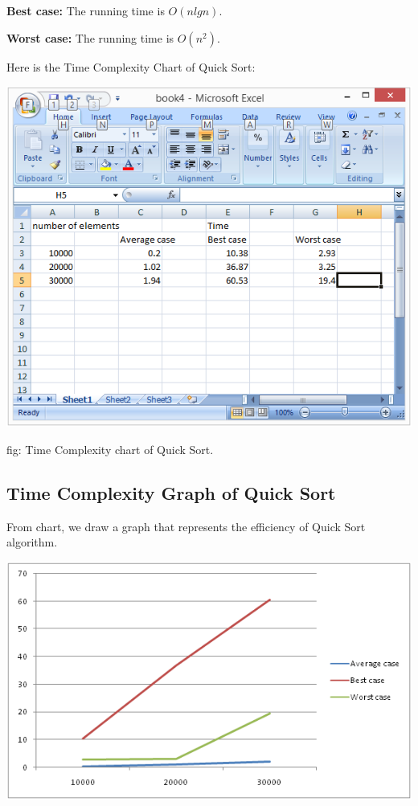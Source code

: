 \documentclass[12 pt,a4paper]{report}
\begin{document}
\textbf{Best case:} The running time is $O(nlgn)$.

\textbf{Worst case:} The running time is $O(n^2)$.


\vspace{0.5cm}

Here is the Time Complexity Chart of Quick Sort:

\includegraphics{quickdata.png}

\hspace{5cm}fig: Time Complexity chart of Quick Sort.

\subsection{Time Complexity Graph of Quick Sort}

From chart, we draw a graph that represents the efficiency of Quick Sort algorithm.

\vspace{1cm}

\includegraphics{quicksort.png}
\end{document}
